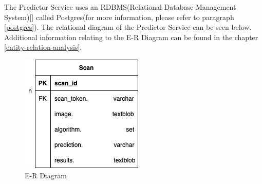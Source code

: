 			The Predictor Service uses an RDBMS(Relational Database Management System)[\cite{friedrichsen_ruffolo_monk_starks_pratt_last_1995}] called Postgres(for more information, please 
			refer to paragraph \ref{postgres}). The relational diagram of the Predictor Service can be seen below. Additional information relating to 
			the E-R Diagram can be found in the chapter \ref{entity-relation-analysis}.
			\begin{figure}[H]
				\iftrue
				\caption{E-R Diagram}
				\centering
				\includegraphics[scale=0.6]{figures/PredictorServiceDatabaseDiagram}
				\fi
			\end{figure}
		
		
			
		